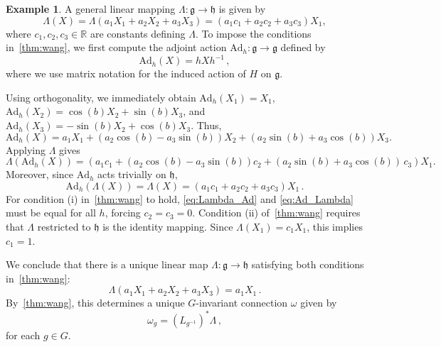 \documentclass[12pt,a4paper]{article}
\numberwithin{equation}{section}
\newcommand{\R}{\mathbb{R}}
\theoremstyle{plain}
\theoremstyle{definition}
\newtheorem{example}[theorem]{Example}
\theoremstyle{remark}
\begin{document}
\begin{example}
A general linear mapping $\Lambda:\mathfrak{g}\to\mathfrak{h}$ is given by
\begin{equation}
    \Lambda(X) = \Lambda(a_1X_1+a_2X_2+a_3X_3)=(a_1c_1+a_2c_2+a_3c_3)X_1,
\end{equation}
where $c_1,c_2,c_3\in\R$ are constants defining $\Lambda$. To impose the conditions in~\cref{thm:wang}, we first compute the adjoint action $\mathrm{Ad}_h:\mathfrak{g}\to\mathfrak{g}$ defined by
\begin{equation}
    \mathrm{Ad}_h(X)=hXh^{-1}\,,
\end{equation}
where we use matrix notation for the induced action of $H$ on $\mathfrak{g}$.

Using orthogonality, we immediately obtain $\mathrm{Ad}_h(X_1)=X_1$, $\mathrm{Ad}_h(X_2)=\cos(b)X_2+\sin(b)X_3$, and $\mathrm{Ad}_h(X_3)=-\sin(b)X_2+\cos(b)X_3$. Thus,
\begin{equation}
    \mathrm{Ad}_h(X) = a_1X_1 + (a_2\cos(b)-a_3\sin(b))X_2 + (a_2\sin(b)+a_3\cos(b))X_3.
\end{equation}
Applying $\Lambda$ gives
\begin{equation}\label{eq:Lambda_Ad}
    \Lambda(\mathrm{Ad}_h(X))=\left(a_1c_1 + (a_2\cos(b)-a_3\sin(b))c_2 + (a_2\sin(b)+a_3\cos(b))\,c_3\right)X_1.
\end{equation}
Moreover, since $\mathrm{Ad}_h$ acts trivially on $\mathfrak{h}$,
\begin{equation}\label{eq:Ad_Lambda}
    \mathrm{Ad}_h(\Lambda(X))=\Lambda(X)=(a_1c_1+a_2c_2+a_3c_3)X_1 \,.
\end{equation}
For condition (i) in~\cref{thm:wang} to hold, \eqref{eq:Lambda_Ad} and \eqref{eq:Ad_Lambda} must be equal for all $h$, forcing $c_2=c_3=0$. Condition (ii) of~\cref{thm:wang} requires that $\Lambda$ restricted to $\mathfrak{h}$ is the identity mapping. Since $\Lambda(X_1)=c_1X_1$, this implies $c_1=1$.

We conclude that there is a unique linear map $\Lambda:\mathfrak{g}\to\mathfrak{h}$ satisfying both conditions in~\cref{thm:wang}:
\begin{equation}
    \Lambda(a_1X_1+a_2X_2+a_3X_3)=a_1X_1\,.
\end{equation}
By~\cref{thm:wang}, this determines a unique $G$-invariant connection $\omega$ given by
\begin{equation}
    \omega_g=(L_{g^{-1}})^*\Lambda\,,
\end{equation}
for each $g\in G$.
\end{example}
\end{document}
